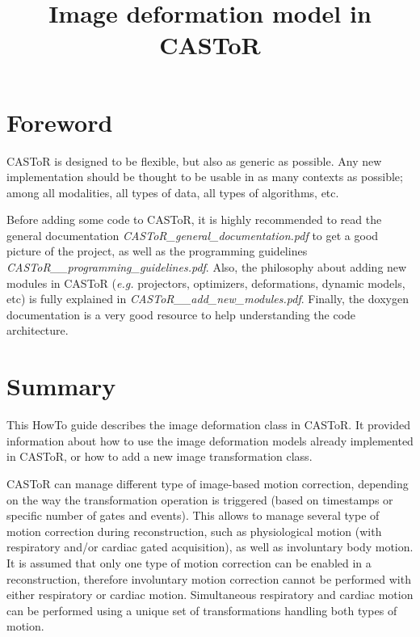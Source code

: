 \documentclass[a4paper, 11pt]{article}
\begin{document}
\title{Image deformation model in CASToR}
\maketitle

\section*{Foreword}

CASToR is designed to be flexible, but also as generic as possible.
Any new implementation should be thought to be usable in as many contexts as possible; among all modalities, all types of data, all types of algorithms, etc.

Before adding some code to CASToR, it is highly recommended to read the general documentation \textit{CASToR\_general\_documentation.pdf} to get a good
picture of the project, as well as the programming guidelines \textit{CASToR\_\_programming\_guidelines.pdf}.
Also, the philosophy about adding new modules in CASToR (\textit{e.g.} projectors, optimizers, deformations, dynamic models, etc) is fully explained in \textit{CASToR\_\_add\_new\_modules.pdf}.
Finally, the doxygen documentation is a very good resource to help understanding the code architecture.

\section{Summary}

This HowTo guide describes the image deformation class in CASToR. It provided information about how to use the image deformation models already implemented in CASToR, or how to add a new image transformation class. 

CASToR can manage different type of image-based motion correction, depending on the way the transformation operation is triggered (based on timestamps or specific number of gates and events). This allows to manage several type of motion correction during reconstruction, such as physiological motion (with respiratory and/or cardiac gated acquisition), as well as involuntary body motion. It is assumed that only one type of motion correction can be enabled in a reconstruction, therefore involuntary motion correction cannot be performed with either respiratory or cardiac motion. Simultaneous respiratory and cardiac motion can be performed using a unique set of transformations handling both types of motion.
\end{document}
